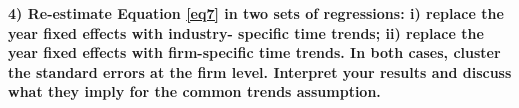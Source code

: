 \documentclass[a4paper,12pt,oneside,English]{article}
\begin{document}
\textbf{4) Re-estimate Equation \ref{eq7} in two sets of regressions: i) replace the year fixed effects with industry- specific time trends; ii) replace the year fixed effects with firm-specific time trends. In both cases, cluster the standard errors at the firm level. Interpret your results and discuss what they imply for the common trends assumption.}
\end{document}
